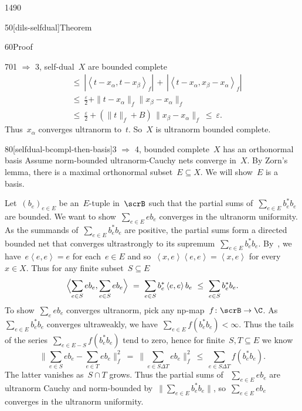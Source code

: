 \begin{parsec}{1490}
\begin{point}{50}[dils-selfdual]{Theorem}
\begin{point}{60}{Proof}
\begin{point}{70}{1 $\Rightarrow$ 3, self-dual~$X$ are bounded complete}
\begin{align*}
    & \ \leq\  |\left<t-x_\alpha,t-x_\beta\right>_f| \,
    +\, |\left<t-x_\alpha,x_\beta-x_\alpha\right>_f| \\
    & \ \leq\  \frac{\varepsilon}{2}
    + \| t- x_\alpha \|_f \|x_\beta - x_\alpha\|_f\\
    & \ \leq\  \frac{\varepsilon}{2}
    + (\| t\|_f + B) \,\|x_\beta - x_\alpha\|_f \ \leq\  \varepsilon.
\end{align*}
Thus~$x_\alpha$ converges ultranorm to~$t$.
So~$X$ is ultranorm bounded complete.
\end{point}
\begin{point}{80}[selfdual-bcompl-then-basis]{3
    $\Rightarrow$ 4, bounded complete~$X$ has an orthonormal basis}
    Assume norm-bounded ultranorm-Cauchy nets converge in~$X$.
By Zorn's lemma, there is a maximal orthonormal subset~$E \subseteq X$.
We will show~$E$ is a basis.

Let~$(b_e)_{e \in E}$ be an~$E$-tuple in~$\scrB$
such that the partial sums of~$\sum_{e \in E} b_e^*b_e$ are bounded.
We want to show~$\sum_{e \in E} e b_e$ converges in the ultranorm
    uniformity.
As the summands of~$\sum_{e \in E}b_e^*b_e$ are positive,
    the partial sums form a directed bounded net
    that converges ultrastrongly
    to its supremum~$\sum_{e \in E} b_e^*b_e$.
By~,
    we have~$e \left<e,e\right> = e$ for each~$e \in E$
    and so~$\left<x,e\right>\left<e,e\right> = \left<x,e\right>$
    for every~$x \in X$.
Thus for any finite subset~$S \subseteq E$
\begin{equation*}
    \Bigl<\sum_{e \in S} eb_e, \sum_{e \in S} eb_e\Bigr>
    \ =\  \sum_{e \in S} b_e^* \left<e,e\right>b_e
    \ \leq\  \sum_{e \in S} b_e^*b_e.
\end{equation*}
To show~$\sum_e eb_e$ converges ultranorm,
    pick any np-map~$f\colon \scrB \to \C$.
As~$\sum_{e \in E} b^*_eb_e$ converges ultraweakly,
we have~$\sum_{e \in E} f(b^*_eb_e) < \infty$.
Thus the tails of the series~$\sum_{e \in E - S} f(b_e^*b_e)$ tend to zero, hence for finite~$S,T\subseteq E$ we know
\begin{equation*}
    \bigl\| \sum_{e \in S} eb_e - \sum_{e\in T} eb_e \bigr\|_f^2
        \ =\  \bigl\| \sum_{e \in S\Delta T} eb_e  \bigr\|_f^2
        \ \leq \ \sum_{e \in S\Delta T} f(b_e^*b_e).
\end{equation*}
The latter vanishes as~$S \cap T$ grows.
Thus the partial sums of ~$\sum_{e \in E} eb_e$ are ultranorm Cauchy
and norm-bounded by~$\| \sum_{e \in E} b_e^*b_e \|$,
so~$\sum_{e \in E} eb_e$ converges in the ultranorm uniformity.


\end{point}
\end{point}
\end{point}
\end{parsec}
